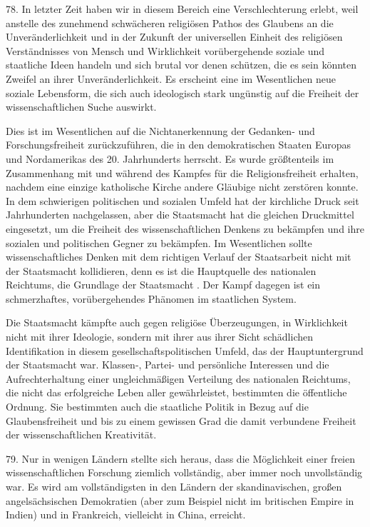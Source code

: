 \documentclass[11pt,a4paper]{book}
\begin{document}
78. In letzter Zeit haben wir in diesem Bereich eine Verschlechterung erlebt, weil anstelle des zunehmend schwächeren religiösen Pathos des Glaubens an die Unveränderlichkeit und in der Zukunft der universellen Einheit des religiösen Verständnisses von Mensch und Wirklichkeit vorübergehende soziale und staatliche Ideen handeln und sich brutal vor denen schützen, die es sein könnten Zweifel an ihrer Unveränderlichkeit. Es erscheint eine im Wesentlichen neue soziale Lebensform, die sich auch ideologisch stark ungünstig auf die Freiheit der wissenschaftlichen Suche auswirkt.



Dies ist im Wesentlichen auf die Nichtanerkennung der Gedanken- und Forschungsfreiheit zurückzuführen, die in den demokratischen Staaten Europas und Nordamerikas des 20. Jahrhunderts herrscht. Es wurde größtenteils im Zusammenhang mit und während des Kampfes für die Religionsfreiheit erhalten, nachdem eine einzige katholische Kirche andere Gläubige nicht zerstören konnte. In dem schwierigen politischen und sozialen Umfeld hat der kirchliche Druck seit Jahrhunderten nachgelassen, aber die Staatsmacht hat die gleichen Druckmittel eingesetzt, um die Freiheit des wissenschaftlichen Denkens zu bekämpfen und ihre sozialen und politischen Gegner zu bekämpfen. Im Wesentlichen sollte wissenschaftliches Denken mit dem richtigen Verlauf der Staatsarbeit nicht mit der Staatsmacht kollidieren, denn es ist die Hauptquelle des nationalen Reichtums, die Grundlage der Staatsmacht . Der Kampf dagegen ist ein schmerzhaftes, vorübergehendes Phänomen im staatlichen System.



Die Staatsmacht kämpfte auch gegen religiöse Überzeugungen, in Wirklichkeit nicht mit ihrer Ideologie, sondern mit ihrer aus ihrer Sicht schädlichen Identifikation in diesem gesellschaftspolitischen Umfeld, das der Hauptuntergrund der Staatsmacht war. Klassen-, Partei- und persönliche Interessen und die Aufrechterhaltung einer ungleichmäßigen Verteilung des nationalen Reichtums, die nicht das erfolgreiche Leben aller gewährleistet, bestimmten die öffentliche Ordnung. Sie bestimmten auch die staatliche Politik in Bezug auf die Glaubensfreiheit und bis zu einem gewissen Grad die damit verbundene Freiheit der wissenschaftlichen Kreativität.



79. Nur in wenigen Ländern stellte sich heraus, dass die Möglichkeit einer freien wissenschaftlichen Forschung ziemlich vollständig, aber immer noch unvollständig war. Es wird am vollständigsten in den Ländern der skandinavischen, großen angelsächsischen Demokratien (aber zum Beispiel nicht im britischen Empire in Indien) und in Frankreich, vielleicht in China, erreicht.
\end{document}

